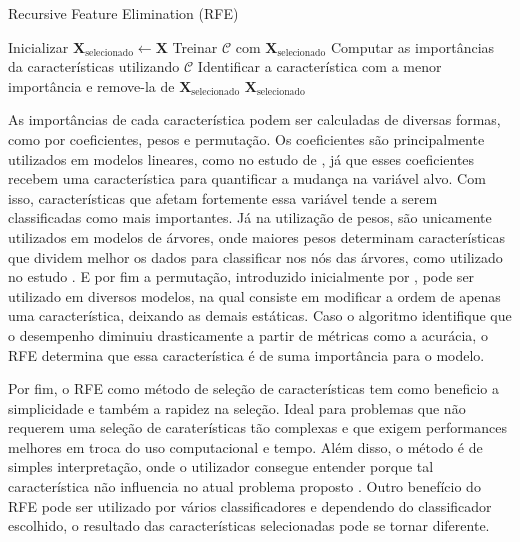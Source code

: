 \begin{algorithm}
  \caption{Recursive Feature Elimination (RFE)}
  \label{alg:rfe}
  \begin{algorithmic}[1]
    \STATE Inicializar $\mathbf{X}_{\text{selecionado}} \leftarrow \mathbf{X}$
    \STATE Treinar $\mathcal{C}$ com $\mathbf{X}_{\text{selecionado}}$
    \STATE Computar as importâncias da características utilizando $\mathcal{C}$
    \STATE Identificar a característica com a menor importância e remove-la de $\mathbf{X}_{\text{selecionado}}$
    \ENDWHILE
    \RETURN $\mathbf{X}_{\text{selecionado}}$
  \end{algorithmic}
\end{algorithm}

As importâncias de cada característica podem ser calculadas de diversas formas, como por coeficientes, pesos e permutação. Os coeficientes são principalmente utilizados em modelos lineares, como no estudo de \cite{fonti2017feature}, já que esses coeficientes recebem uma característica para quantificar a mudança na variável alvo. Com isso, características que afetam fortemente essa variável tende a serem classificadas como mais importantes. Já na utilização de pesos, são unicamente utilizados em modelos de árvores, onde maiores pesos determinam características que dividem melhor os dados para classificar nos nós das árvores, como utilizado no estudo \cite{zhou2021landslide}. E por fim a permutação, introduzido inicialmente por \cite{breiman2001random}, pode ser utilizado em diversos modelos, na qual consiste em modificar a ordem de apenas uma característica, deixando as demais estáticas. Caso o algoritmo identifique que o desempenho diminuiu drasticamente a partir de métricas como a acurácia, o RFE determina que essa característica é de suma importância para o modelo.

Por fim, o RFE como método de seleção de características tem como beneficio a simplicidade e também a rapidez na seleção. Ideal para problemas que não requerem uma seleção de caraterísticas tão complexas e que exigem performances melhores em troca do uso computacional e tempo. Além disso, o método é de simples interpretação, onde o utilizador consegue entender porque tal característica não influencia no atual problema proposto \cite{chen2007enhanced}. Outro benefício do RFE pode ser utilizado por vários classificadores e dependendo do classificador escolhido, o resultado das características selecionadas pode se tornar diferente.

